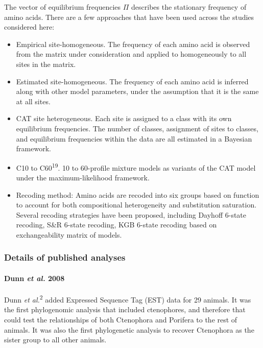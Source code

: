 \documentclass[]{article}
\let\oldparagraph\paragraph
\renewcommand{\paragraph}[1]{\oldparagraph{#1}\mbox{}}
\begin{document}
The vector of equilibrium frequencies \(\Pi\) describes the stationary
frequency of amino acids. There are a few approaches that have been used
across the studies considered here:

\begin{itemize}
\item
  Empirical site-homogeneous. The frequency of each amino acid is
  observed from the matrix under consideration and applied to
  homogeneously to all sites in the matrix.
\item
  Estimated site-homogeneous. The frequency of each amino acid is
  inferred along with other model parameters, under the assumption that
  it is the same at all sites.
\item
  CAT site heterogeneous. Each site is assigned to a class with its own
  equilibrium frequencies. The number of classes, assignment of sites to
  classes, and equilibrium frequencies within the data are all estimated
  in a Bayesian framework.
\item
  C10 to C60\textsuperscript{19}. 10 to 60-profile mixture models as
  variants of the CAT model under the maximum-likelihood framework.
\item
  Recoding method: Amino acids are recoded into six groups based on
  function to account for both compositional heterogeneity and
  substitution saturation. Several recoding strategies have been
  proposed, including Dayhoff 6-state recoding, S\&R 6-state recoding,
  KGB 6-state recoding based on exchangeability matrix of models.
\end{itemize}

\hypertarget{details-of-published-analyses}{%
\subsubsection{Details of published
analyses}\label{details-of-published-analyses}}

\hypertarget{dunn-et-al.-2008}{%
\paragraph{\texorpdfstring{Dunn \emph{et al.}
2008}{Dunn et al. 2008}}\label{dunn-et-al.-2008}}

Dunn \emph{et al.}\textsuperscript{2} added Expressed Sequence Tag (EST)
data for 29 animals. It was the first phylogenomic analysis that
included ctenophores, and therefore that could test the relationships of
both Ctenophora and Porifera to the rest of animals. It was also the
first phylogenetic analysis to recover Ctenophora as the sister group to
all other animals.
\end{document}
